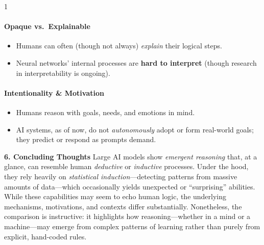 {\begin{spacing}{1}
\paragraph{Opaque vs.\ Explainable}
\begin{itemize}
    \item Humans can often (though not always) \emph{explain} their logical steps.
    \item Neural networks' internal processes are \textbf{hard to interpret} (though research in interpretability is ongoing).
\end{itemize}

\paragraph{Intentionality \& Motivation}
\begin{itemize}
    \item Humans reason with goals, needs, and emotions in mind.
    \item AI systems, as of now, do not \emph{autonomously} adopt or form real-world goals; they predict or respond as prompts demand.
\end{itemize}

\noindent \textbf{6. Concluding Thoughts}
Large AI models show \emph{emergent reasoning} that, at a glance, can resemble human \emph{deductive} or \emph{inductive} processes. Under the hood, they rely heavily on \emph{statistical induction}---detecting patterns from massive amounts of data---which occasionally yields unexpected or ``surprising'' abilities. While these capabilities may seem to echo human logic, the underlying mechanisms, motivations, and contexts differ substantially. Nonetheless, the comparison is instructive: it highlights how reasoning---whether in a mind or a machine---may emerge from complex patterns of learning rather than purely from explicit, hand-coded rules.
\end{spacing}
}